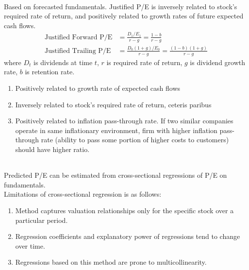 \begin{definition} \\
Based on forecasted fundamentals. Justified P/E is inversely related to stock's required rate of return, and positively related to growth rates of future expected cash flows.
\begin{align}
\text{Justified Forward P/E} &= \frac{D_1 / E_1}{r-g} = \frac{1-b}{r-g} \nonumber \\
\text{Justified Trailing P/E} &= \frac{D_0 (1+g) / E_0}{r-g} = \frac{(1-b)(1+g)}{r-g} \nonumber
\end{align}
where $D_t$ is dividends at time $t$, $r$ is required rate of return, $g$ is dividend growth rate, $b$ is retention rate.
\end{definition}

\begin{remark} 
\begin{enumerate}[label=\roman*.]
\setlength{\itemsep}{0pt}
\item Positively related to growth rate of expected cash flows
\item Inversely related to stock's required rate of return, ceteris paribus
\item Positively related to inflation pass-through rate. If two similar companies operate in same inflationary environment, firm with higher inflation pass-through rate (ability to pass some portion of higher costs to customers) should have higher ratio.
\end{enumerate}
\end{remark}

\begin{remark} \\
Predicted P/E can be estimated from cross-sectional regressions of P/E on fundamentals.\\
Limitations of cross-sectional regression is as follows:
\begin{enumerate}[label=\roman*.]
\setlength{\itemsep}{0pt}
\item Method captures valuation relationships only for the specific stock over a particular period.
\item Regression coefficients and explanatory power of regressions tend to change over time.
\item Regressions based on this method are prone to multicollinearity.
\end{enumerate}
\end{remark}

